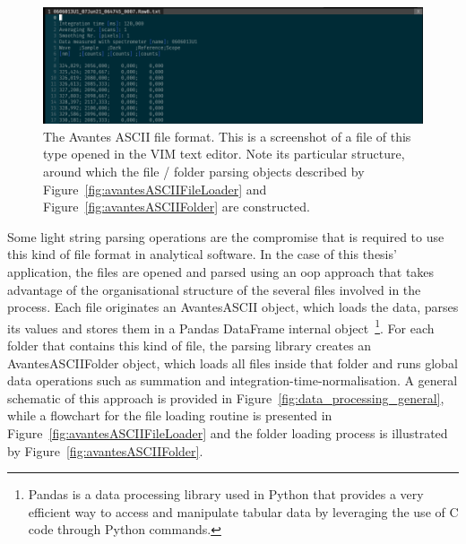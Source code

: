 \begin{figure}[htpb]
    \centering
    \includegraphics[width=\linewidth]{img/png/avantes_ascii.png}
    \caption{The Avantes ASCII file format. This is a screenshot of a
        file of this type opened in the VIM text editor. Note its
        particular structure, around which the file / folder parsing
        objects described by Figure~\ref{fig:avantesASCIIFileLoader} and
        Figure~\ref{fig:avantesASCIIFolder} are constructed.}
        \label{fig:avantesASCIIFile}
\end{figure}

Some light string parsing operations are the compromise that is required
to use this kind of file format in analytical software. In the case of
this thesis' application, the files are opened and parsed using an
\gls{oop} approach that takes advantage of the organisational structure
of the several files involved in the process. Each file originates an
AvantesASCII object, which loads the data, parses its values and stores
them in a Pandas DataFrame internal object~\footnote{Pandas is a data
processing library used in Python that provides a very efficient way to
access and manipulate tabular data by leveraging the use of C code
through Python commands.}. For each folder that contains this kind of
file, the parsing library creates an AvantesASCIIFolder object, which
loads all files inside that folder and runs global data operations such
as summation and integration-time-normalisation. A general schematic of
this approach is provided in Figure~\ref{fig:data_processing_general},
while a flowchart for the file loading routine is presented in
Figure~\ref{fig:avantesASCIIFileLoader} and the folder loading process
is illustrated by Figure~\ref{fig:avantesASCIIFolder}.

